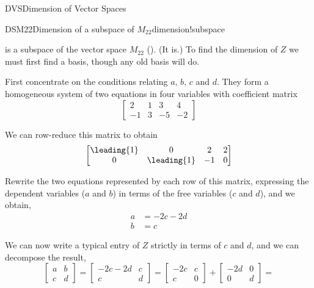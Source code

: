 \begin{subsect}{DVS}{Dimension of Vector Spaces}
\begin{example}{DSM22}{Dimension of a subspace of $M_{22}$}{dimension!subspace}
\begin{para}
\begin{equation*}
\end{equation*}
%
is a subspace of the vector space $M_{22}$ ().  (It is.)  To find the dimension of $Z$ we must first find a basis, though any old basis will do.\end{para}
%
\begin{para}First concentrate on the conditions relating $a,\,b,\,c$ and $d$.  They form a homogeneous system of two equations in four variables with coefficient matrix
%
\begin{equation*}
\begin{bmatrix}
2 & 1 & 3 & 4\\
-1 & 3 & -5 & -2
\end{bmatrix}
\end{equation*}
\end{para}
%
\begin{para}We can row-reduce this matrix to obtain
%
\begin{equation*}
\begin{bmatrix}
\leading{1} & 0 & 2 & 2\\
0 & \leading{1} & -1 & 0
\end{bmatrix}
\end{equation*}
\end{para}
%
\begin{para}Rewrite the two equations represented by each row of this matrix, expressing the dependent variables ($a$ and $b$) in terms of the free variables ($c$ and $d$), and we obtain,
%
\begin{align*}
a&=-2c-2d\\
b&=c
\end{align*}
\end{para}
%
\begin{para}We can now write a typical entry of $Z$ strictly in terms of $c$ and $d$, and we can decompose the result,
%
\begin{equation*}
\begin{bmatrix}a&b\\c&d\end{bmatrix}=
\begin{bmatrix}-2c-2d&c\\c&d\end{bmatrix}=
%
\begin{bmatrix}-2c&c\\c&0\end{bmatrix}+
\begin{bmatrix}-2d&0\\0&d\end{bmatrix}=

\end{equation*}
\end{para}
\end{example}
\end{subsect}
